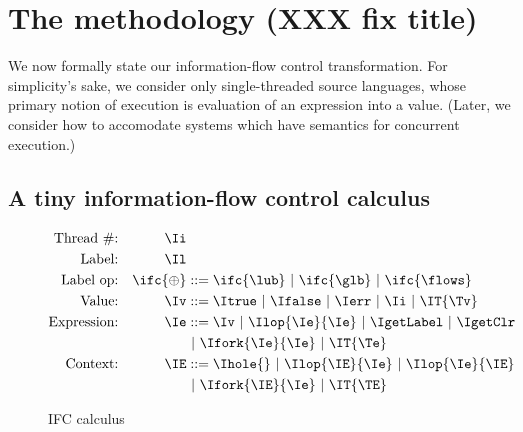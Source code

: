 \section{The methodology (XXX fix title)}
\label{sec:methodology}

We now formally state our information-flow control transformation.  For
simplicity's sake, we consider only single-threaded source languages,
whose primary notion of execution is evaluation of an expression into a
value.  (Later, we consider how to accomodate systems which have
semantics for concurrent execution.)

\subsection{A tiny information-flow control calculus}

\begin{figure}[h]
\begin{align*}
\textrm{Thread \#:}   && \Ii          &   \\
\textrm{Label:}       && \Il          &   \\
\textrm{Label op:}    && \ifc{\oplus} & ::=  \ifc{\lub}
                                        \ |\ \ifc{\glb}
                                        \ |\ \ifc{\flows}\\
\textrm{Value:}       && \Iv          & ::=  \Itrue 
                                        \ |\ \Ifalse
                                        \ |\ \Ierr
                                        \ |\ \Ii
                                        \ |\ \IT{\Tv}\\
\textrm{Expression:}  && \Ie          & ::=  \Iv
                                        \ |\ \Ilop{\Ie}{\Ie}
                                        \ |\ \IgetLabel
                                        \ |\ \IgetClr\\&&&
                                        \ |\ \Ifork{\Ie}{\Ie}
                                        \ |\ \IT{\Te}\\
\textrm{Context:}     && \IE          & ::=  \Ihole{}
                                        \ |\ \Ilop{\IE}{\Ie}
                                        \ |\ \Ilop{\Ie}{\IE}\\&&&
                                        \ |\ \Ifork{\IE}{\Ie}
                                        \ |\ \IT{\TE}\\
\end{align*}
\caption{IFC calculus}
\end{figure}

